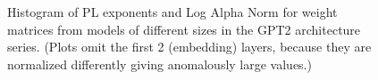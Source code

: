 \begin{figure}[htb]
    \centering
    \quad
    \caption{Histogram of PL exponents 
             and Log Alpha Norm 
             for weight matrices from models of different sizes in the GPT2 architecture series.  (Plots omit the first 2 (embedding) layers, because they are normalized differently giving anomalously large values.)
             }
    \label{fig:gpt2-histograms}
\end{figure}
